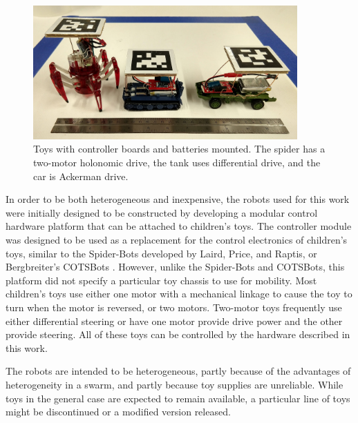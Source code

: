 \begin{figure}
	\centering
	\includegraphics[width=0.9\textwidth]{../robots_with_ruler_small}
	\caption{Toys with controller boards and batteries mounted. The spider has a two-motor holonomic drive, the tank uses differential drive, and the car is Ackerman drive.}
\end{figure}

In order to be both heterogeneous and inexpensive, the robots used for this work were initially designed to be constructed by developing a modular control hardware platform that can be attached to children's toys. 
The controller module was designed to be used as a replacement for the control electronics of children's toys, similar to the Spider-Bots developed by Laird, Price, and Raptis, or Bergbreiter's COTSBots \citep{lairdspider, bergbreiter2003cotsbots}.
However, unlike the Spider-Bots and COTSBots, this platform did not specify a particular toy chassis to use for mobility. 
Most children's toys use either one motor with a mechanical linkage to cause the toy to turn when the motor is reversed, or two motors.
Two-motor toys frequently use either differential steering or have one motor provide drive power and the other provide steering. 
All of these toys can be controlled by the hardware described in this work. 

The robots are intended to be heterogeneous, partly because of the advantages of heterogeneity in a swarm, and partly because toy supplies are unreliable.
While toys in the general case are expected to remain available, a particular line of toys might be discontinued or a modified version released. 

